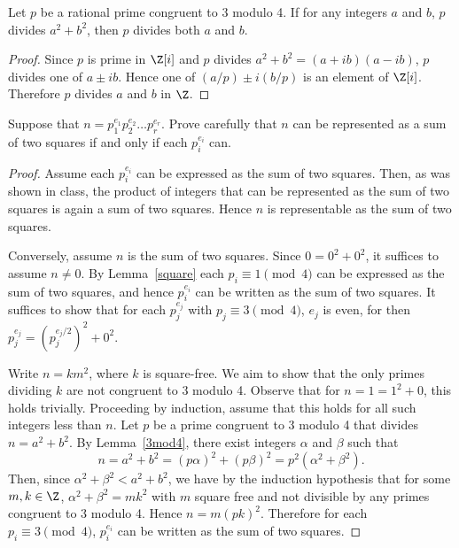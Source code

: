 \documentclass[10pt]{amsart}
\begin{document}
\begin{lem}\label{3mod4}
  Let $p$ be a rational prime congruent to 3 modulo 4.
  If for any integers $a$ and $b$, $p$ divides $a^2 + b^2$, then $p$ divides both $a$ and $b$.
  \begin{proof}
    Since $p$ is prime in $\Z[i]$ and $p$ divides $a^2 + b^2 = (a + ib)(a-ib)$, $p$ divides one of $a \pm ib$.
    Hence one of $(a/p) \pm i(b/p)$ is an element of $\Z[i]$. 
    Therefore $p$ divides $a$ and $b$ in $\Z$.
  \end{proof}
\end{lem}

\setcounter{thm}{2}
\begin{thm}
  Suppose that $n = p_1^{e_1}p_2^{e_2}\ldots p_r^{e_r}$.
  Prove carefully that $n$ can be represented as a sum of two squares if and only if each $p_i^{e_i}$ can.
  
  \begin{proof}
    Assume each $p_i^{e_i}$ can be expressed as the sum of two squares.  Then, as was shown in class, the product of integers that can be represented as the sum of two squares is again a sum of two squares.  Hence $n$ is representable as the sum of two squares.

    Conversely, assume $n$ is the sum of two squares.
    Since $0 = 0^2 + 0^2$, it suffices to assume $n \neq 0$.
    By Lemma~\ref{square} each $p_i \equiv 1 \pmod{4}$ can be expressed as the sum of two squares, and hence $p_i^{e_i}$ can be written as the sum of two squares.
    It suffices to show that for each $p_j^{e_j}$ with $p_j \equiv 3 \pmod{4}$, $e_j$ is even, for then $p_j^{e_j} = \left(p_j^{e_j/2}\right)^2 + 0^2$.

    Write $n = km^2$, where $k$ is square-free.
    We aim to show that the only primes dividing $k$ are not congruent to 3 modulo 4.
    Observe that for $n = 1 = 1^2 + 0$, this holds trivially.
    Proceeding by induction, assume that this holds for all such integers less than $n$.
    Let $p$ be a prime congruent to 3 modulo 4 that divides $n = a^2 + b^2$.
    By Lemma~\ref{3mod4}, there exist integers $\alpha$ and $\beta$ such that 
    $$n = a^2 + b^2 = (p\alpha)^2 + (p\beta)^2 = p^2(\alpha^2 + \beta^2).$$
    Then, since $\alpha^2 + \beta^2 < a^2 + b^2$, we have by the induction hypothesis that for some $m,k \in \Z$, $\alpha^2 + \beta^2 = mk^2$ with $m$ square free and not divisible by any primes congruent to 3 modulo 4.
    Hence $n = m(pk)^2$.
    Therefore for each $p_i \equiv 3 \pmod{4}$, $p_i^{e_i}$ can be written as the sum of two squares.
  \end{proof}
\end{thm}
\end{document}
